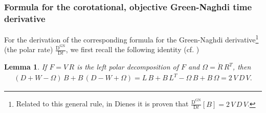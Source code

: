 \documentclass[10pt]{article}
\newcounter{theoremCounter}
\numberwithin{theoremCounter}{section}
\theoremstyle{plain}
\newtheorem{lem}[theoremCounter]{Lemma}
\theoremstyle{definition}
\newcommand{\DD}{\mathrm{D}}
\DeclareMathOperator{\GN}{GN}
\numberwithin{equation}{section}
\begin{document}
\subsubsection{Formula for the corotational, objective Green-Naghdi time derivative}
%
For the derivation of the corresponding formula for the Green-Naghdi derivative\footnote
{
Related to this general rule, in Dienes \cite[p.~13]{dienes1987discussion} it is proven that $\frac{\DD^{\GN}}{\DD t}[B] = 2 \, V \, D \, V$.
}
(the polar rate) $\frac{\DD^{\GN}}{\DD t}$, we first recall the following identity (cf. \cite{dienes1979})
%
	\begin{lem}
	If $F = V \, R$ is the left polar decomposition of $F$ and $\Omega = \dot{R} \, R^T$, then
	\begin{align}
	\label{eqdienes}
	(D+W-\Omega)\, B + B \, (D-W+\Omega) = L \, B + B \, L^T - \Omega \, B + B \, \Omega = 2 \, V \, D \, V .
	\end{align}
	\end{lem}
%
\end{document}
